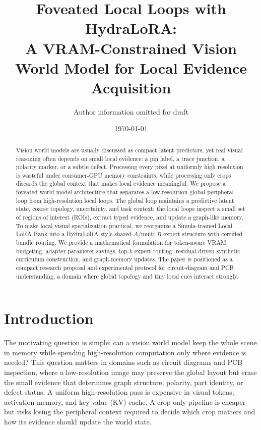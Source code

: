 \documentclass[11pt]{article}
\title{Foveated Local Loops with HydraLoRA:\\
A VRAM-Constrained Vision World Model for Local Evidence Acquisition}
\author{Author information omitted for draft}
\date{\today}
\begin{document}
\maketitle

\begin{abstract}
Vision world models are usually discussed as compact latent predictors, yet real visual reasoning often depends on small local evidence: a pin label, a trace junction, a polarity marker, or a subtle defect.
Processing every pixel at uniformly high resolution is wasteful under consumer-GPU memory constraints, while processing only crops discards the global context that makes local evidence meaningful.
We propose a foveated world-model architecture that separates a low-resolution global peripheral loop from high-resolution local loops.
The global loop maintains a predictive latent state, coarse topology, uncertainty, and task context; the local loops inspect a small set of regions of interest (ROIs), extract typed evidence, and update a graph-like memory.
To make local visual specialization practical, we reorganize a Simula-trained Local LoRA Bank into a HydraLoRA-style shared-$A$/multi-$B$ expert structure with certified bundle routing.
We provide a mathematical formulation for token-aware VRAM budgeting, adapter parameter savings, top-$k$ expert routing, residual-driven synthetic curriculum construction, and graph-memory updates.
The paper is positioned as a compact research proposal and experimental protocol for circuit-diagram and PCB understanding, a domain where global topology and tiny local cues interact strongly.
\end{abstract}

\section{Introduction}

The motivating question is simple: can a vision world model keep the whole scene in memory while spending high-resolution computation only where evidence is needed?
This question matters in domains such as circuit diagrams and PCB inspection, where a low-resolution image may preserve the global layout but erase the small evidence that determines graph structure, polarity, part identity, or defect status.
A uniform high-resolution pass is expensive in visual tokens, activation memory, and key-value (KV) cache.
A crop-only pipeline is cheaper but risks losing the peripheral context required to decide which crop matters and how its evidence should update the world state.
\end{document}

